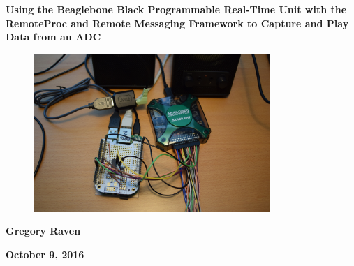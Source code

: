 {\centering\bfseries\color{black}\Huge
Using the Beaglebone Black Programmable Real-Time Unit with the RemoteProc and Remote Messaging Framework to Capture and Play Data from an ADC
\par}

\bigskip

\begin{figure}
	\centering
	\includegraphics[width=0.8\textwidth]{photos/DSC_0021}
\end{figure}

\bigskip
{\centering\bfseries\Large
Gregory Raven
\par}


\bigskip
{\centering\bfseries\LARGE
October 9, 2016
\par}
\newpage




